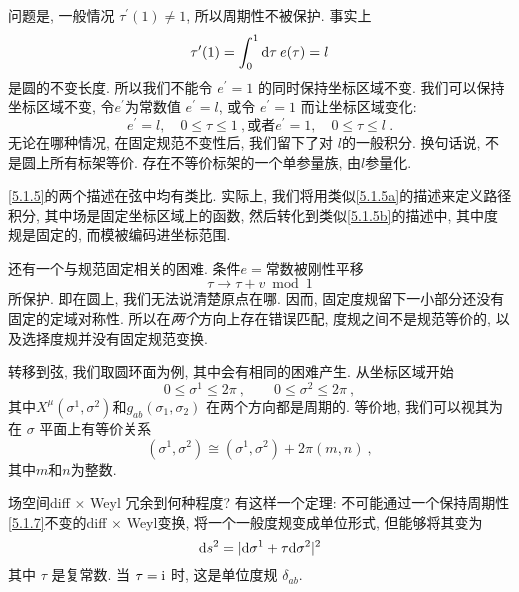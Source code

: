问题是, 一般情况 $\tau^{\prime}(1) \neq 1$, 所以周期性不被保护. 事实上
\begin{equation}
	\tau^{\prime}(1)=\int_{0}^{1} \mathrm{d} \tau \: e(\tau)=l \label{5.1.4}
\end{equation}
是圆的不变长度. 所以我们不能令 $e^{\prime}=1$ 的同时保持坐标区域不变. 我们可以保持坐标区域不变, 令$e^{\prime}$为常数值 $e^{\prime}=l$, 或令 $e^{\prime}=1$ 而让坐标区域变化:
\begin{subequations} \label{5.1.5}
\begin{equation}
e^{\prime}=l, \quad 0 \leq \tau \leq 1 \:, \label{5.1.5a}
\end{equation}
或者
\begin{equation}
e^{\prime}=1, \quad 0 \leq \tau \leq l \:. \label{5.1.5b}
\end{equation}
\end{subequations}
无论在哪种情况, 在固定规范不变性后, 我们留下了对 $l$的一般积分. 换句话说, 不是圆上所有标架等价. 存在不等价标架的一个单参量族, 由$l$参量化.

\eqref{5.1.5}的两个描述在弦中均有类比. 实际上, 我们将用类似\eqref{5.1.5a}的描述来定义路径积分, 其中场是固定坐标区域上的函数, 然后转化到类似\eqref{5.1.5b}的描述中, 
其中度规是固定的, 而模被编码进坐标范围.

还有一个与规范固定相关的困难. 条件$e=\text{常数}$被刚性平移
\begin{equation}
	\tau \rightarrow \tau+v \bmod 1 \label{5.1.6}
\end{equation}
所保护. 即在圆上, 我们无法说清楚原点在哪. 因而, 固定度规留下一小部分还没有固定的定域对称性. 所以在\emph{两个}方向上存在错误匹配, 
度规之间不是规范等价的, 以及选择度规并没有固定规范变换.

转移到弦, 我们取圆环面为例, 其中会有相同的困难产生. 从坐标区域开始
\begin{equation}
	0 \leq \sigma^{1} \leq 2 \pi \:, \qquad 0 \leq \sigma^{2} \leq 2 \pi \:, \label{5.1.7}
\end{equation}
其中$X^{\mu}(\sigma^{1}, \sigma^{2})$和$g_{a b}(\sigma_{1}, \sigma_{2})$ 在两个方向都是周期的. 等价地, 我们可以视其为在 $\sigma$ 平面上有等价关系
\begin{equation}
	(\sigma^{1}, \sigma^{2}) \cong (\sigma^{1}, \sigma^{2})+2 \pi(m, n) \:, \label{5.1.8}
\end{equation}
其中$m$和$n$为整数.

场空间diff $\times$ Weyl 冗余到何种程度? 有这样一个定理: 不可能通过一个保持周期性\eqref{5.1.7}不变的diff $\times$ Weyl变换, 将一个一般度规变成单位形式, 但能够将其变为
\begin{equation}
	\mathrm{d} s^{2}=\lvert \mathrm{d} \sigma^{1}+\tau \mathrm{d} \sigma^{2}\rvert^{2} \label{5.1.9}
\end{equation}
其中 $\tau$ 是复常数. 当 $\tau=\mathrm{i}$ 时, 这是单位度规 $\delta_{a b}$.

